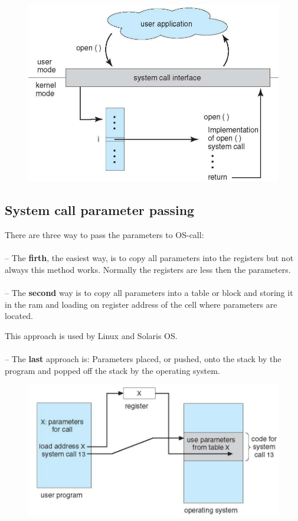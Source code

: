 \begin{figure}[htbp]
    \centering
    \includegraphics[width=0.6\linewidth]{img/API.png}
\end{figure}


\subsection{System call parameter passing}

There are three way to pass the parameters to OS-call:
\paragraph{}
-- The \textbf{firth}, the easiest way, is to copy all parameters into the registers but not always this method works. Normally the registers are less then the parameters.

\paragraph{}
-- The \textbf{second} way is to copy all parameters into a table or block and storing it in the ram and loading on register address of the cell where parameters are located.

This approach is used by Linux and Solaris OS.

\paragraph{}
-- The \textbf{last} approach is: Parameters placed, or pushed, onto the stack by the program
and popped off the stack by the operating system.


\begin{figure}[htbp]
    \centering
    \includegraphics[width=0.6\linewidth]{img/params.png}
\end{figure}



